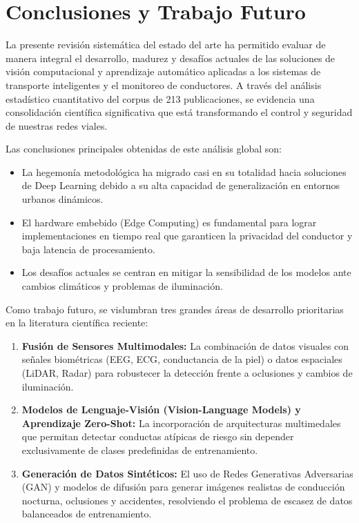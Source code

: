 \section{Conclusiones y Trabajo Futuro}
La presente revisión sistemática del estado del arte ha permitido evaluar de manera integral el desarrollo, madurez y desafíos actuales de las soluciones de visión computacional y aprendizaje automático aplicadas a los sistemas de transporte inteligentes y el monitoreo de conductores. A través del análisis estadístico cuantitativo del corpus de 213 publicaciones, se evidencia una consolidación científica significativa que está transformando el control y seguridad de nuestras redes viales.

Las conclusiones principales obtenidas de este análisis global son:
\begin{itemize}
    \item La hegemonía metodológica ha migrado casi en su totalidad hacia soluciones de Deep Learning debido a su alta capacidad de generalización en entornos urbanos dinámicos.
    \item El hardware embebido (Edge Computing) es fundamental para lograr implementaciones en tiempo real que garanticen la privacidad del conductor y baja latencia de procesamiento.
    \item Los desafíos actuales se centran en mitigar la sensibilidad de los modelos ante cambios climáticos y problemas de iluminación.
\end{itemize}

Como trabajo futuro, se vislumbran tres grandes áreas de desarrollo prioritarias en la literatura científica reciente:
\begin{enumerate}
    \item \textbf{Fusión de Sensores Multimodales:} La combinación de datos visuales con señales biométricas (EEG, ECG, conductancia de la piel) o datos espaciales (LiDAR, Radar) para robustecer la detección frente a oclusiones y cambios de iluminación.
    \item \textbf{Modelos de Lenguaje-Visión (Vision-Language Models) y Aprendizaje Zero-Shot:} La incorporación de arquitecturas multimedales que permitan detectar conductas atípicas de riesgo sin depender exclusivamente de clases predefinidas de entrenamiento.
    \item \textbf{Generación de Datos Sintéticos:} El uso de Redes Generativas Adversarias (GAN) y modelos de difusión para generar imágenes realistas de conducción nocturna, oclusiones y accidentes, resolviendo el problema de escasez de datos balanceados de entrenamiento.
\end{enumerate}
